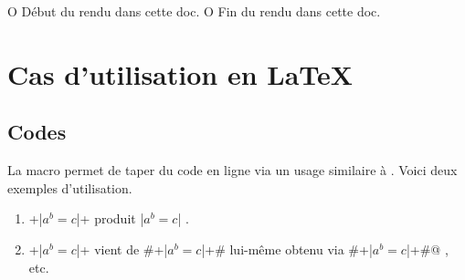 

\usepackage[lang = FR]{../main/main}
\usepackage{../macroenv/macroenv}
\usepackage{../inenglish/inenglish}
\usepackage{../showcase/showcase}
\usepackage{../rem-exa/rem-exa}

\usepackage{listing}





                       { O{ Début du rendu dans cette doc. }
                         O{ Fin du rendu dans cette doc. } }{
    \begin{colorstrip}{green!5}
        \smallskip
}{
        \smallskip
        \bdocextraruler{#2}
    \end{colorstrip}
}




\section{Cas d'utilisation en \LaTeX}

\subsection{Codes }

La macro  permet de taper du code en ligne via un usage similaire à .
Voici deux exemples d'utilisation.

\begin{enumerate}
    \item \bdocinlatex+\bdocinlatex|$a^b = c$|+ produit \bdocinlatex|$a^b = c$| .

    \item \bdocinlatex+\bdocinlatex|$a^b = c$|+ vient de \bdocinlatex#\bdocinlatex+\bdocinlatex|$a^b = c$|+# lui-même obtenu via \bdocinlatex@\bdocinlatex#\bdocinlatex+\bdocinlatex|$a^b = c$|+#@ , etc.
\end{enumerate}


